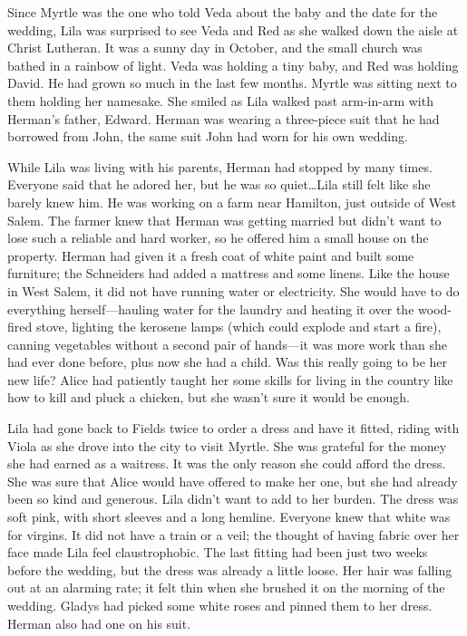 \documentclass[
  american,
  letterpaper,
]{book}
\begin{document}
Since Myrtle was the one who told Veda about the baby and the date for
the wedding, Lila was surprised to see Veda and Red as she walked down
the aisle at Christ Lutheran. It was a sunny day in October, and the
small church was bathed in a rainbow of light. Veda was holding a tiny
baby, and Red was holding David. He had grown so much in the last few
months. Myrtle was sitting next to them holding her namesake. She smiled
as Lila walked past arm-in-arm with Herman's father, Edward. Herman was
wearing a three-piece suit that he had borrowed from John, the same suit
John had worn for his own wedding.

While Lila was living with his parents, Herman had stopped by many
times. Everyone said that he adored her, but he was so quiet\ldots Lila
still felt like she barely knew him. He was working on a farm near
Hamilton, just outside of West Salem. The farmer knew that Herman was
getting married but didn't want to lose such a reliable and hard worker,
so he offered him a small house on the property. Herman had given it a
fresh coat of white paint and built some furniture; the Schneiders had
added a mattress and some linens. Like the house in West Salem, it did
not have running water or electricity. She would have to do everything
herself---hauling water for the laundry and heating it over the
wood-fired stove, lighting the kerosene lamps (which could explode and
start a fire), canning vegetables without a second pair of hands---it
was more work than she had ever done before, plus now she had a child.
Was this really going to be her new life? Alice had patiently taught her
some skills for living in the country like how to kill and pluck a
chicken, but she wasn't sure it would be enough.

Lila had gone back to Fields twice to order a dress and have it fitted,
riding with Viola as she drove into the city to visit Myrtle. She was
grateful for the money she had earned as a waitress. It was the only
reason she could afford the dress. She was sure that Alice would have
offered to make her one, but she had already been so kind and generous.
Lila didn't want to add to her burden. The dress was soft pink, with
short sleeves and a long hemline. Everyone knew that white was for
virgins. It did not have a train or a veil; the thought of having fabric
over her face made Lila feel claustrophobic. The last fitting had been
just two weeks before the wedding, but the dress was already a little
loose. Her hair was falling out at an alarming rate; it felt thin when
she brushed it on the morning of the wedding. Gladys had picked some
white roses and pinned them to her dress. Herman also had one on his
suit.
\end{document}
